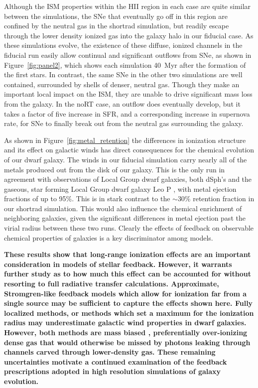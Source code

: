 \documentclass[twocolumn]{aastex62}
\begin{document}
Although the ISM properties within the HII region in each case are quite similar between the simulations, the SNe that eventually go off in this region are confined by the neutral gas in the shortrad simulation, but readily escape through the lower density ionized gas into the galaxy halo in our fiducial case. As these simulations evolve, the existence of these diffuse, ionized channels in the fiducial run easily allow continual and significant outflows from SNe, as shown in  Figure~\ref{fig:panel2}, which shows each simulation 40~Myr after the formation of the first stars. In contrast, the same SNe in the other two simulations are well contained, surrounded by shells of denser, neutral gas. Though they make an important local impact on the ISM, they are unable to drive significant mass loss from the galaxy. In the noRT case, an outflow does eventually develop, but it takes a factor of five increase in SFR, and a corresponding increase in supernova rate, for SNe to finally break out from the neutral gas surrounding the galaxy. 

As shown in Figure~\ref{fig:metal_retention} the differences in ionization structure and its effect on galactic winds has direct consequences for the chemical evolution of our dwarf galaxy. The winds in our fiducial simulation carry nearly all of the metals produced out from the disk of our galaxy. This is the only run in agreement with observations of Local Group dwarf galaxies, both dSph's \citep{Kirby2011} and the gaseous, star forming Local Group dwarf galaxy Leo P \citep{McQuinn2015}, with metal ejection fractions of up to 95\%. This is in stark contrast to the $\sim$30\% retention fraction in our shortrad simulation. This would also influence the chemical enrichment of neighboring galaxies, given the significant differences in metal ejection past the virial radius between these two runs. Clearly the effects of feedback on observable chemical properties of galaxies is a key discriminator among models.

\textbf{These results show that long-range ionization effects are an important consideration in models of stellar feedback. However, it warrants further study as to how much this effect can be accounted for without resorting to full radiative transfer calculations. Approximate, Stromgren-like feedback models which allow for ionization far from a single source \citep[e.x.][]{Hopkins2018} may be sufficient to capture the effects shown here. Fully localized methods, or methods which set a maximum for the ionization radius may underestimate galactic wind properties in dwarf galaxies. However, both methods are mass biased \citep[see the discussion in ][]{Hu2017}, preferentially over-ionizing dense gas that would otherwise be missed by photons leaking through channels carved through lower-density gas. These remaining uncertainties motivate a continued examination of the feedback prescriptions adopted in high resolution simulations of galaxy evolution.}
\end{document}
